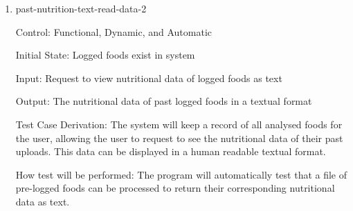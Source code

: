 \documentclass[12pt, titlepage]{article}
\begin{document}
	\begin{enumerate}
		
		\item{past-nutrition-text-read-data-2\\}
		
		Control: Functional, Dynamic, and Automatic
		
		Initial State: Logged foods exist in system
		
		Input: Request to view nutritional data of logged foods as text
		
		Output: The nutritional data of past logged foods in a textual format
		
		Test Case Derivation: The system will keep a record of all analysed foods for the user, allowing the user to request to see the nutritional data of their past uploads. This data can be displayed in a human readable textual format.
		
		How test will be performed: The program will automatically test that a file of pre-logged foods can be processed to return their corresponding nutritional data as text.
		
	\end{enumerate}
\end{document}

